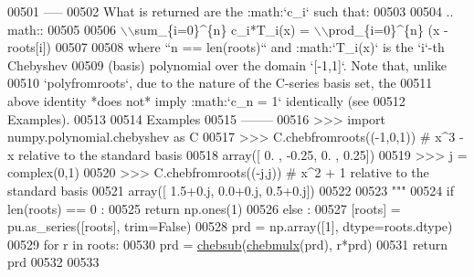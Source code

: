 \begin{DoxyCode}
00501 \textcolor{stringliteral}{    -----}
00502 \textcolor{stringliteral}{    What is returned are the :math:`c\_i` such that:}
00503 \textcolor{stringliteral}{}
00504 \textcolor{stringliteral}{    .. math::}
00505 \textcolor{stringliteral}{}
00506 \textcolor{stringliteral}{        \(\backslash\)\(\backslash\)sum\_\{i=0\}^\{n\} c\_i*T\_i(x) = \(\backslash\)\(\backslash\)prod\_\{i=0\}^\{n\} (x - roots[i])}
00507 \textcolor{stringliteral}{}
00508 \textcolor{stringliteral}{    where ``n == len(roots)`` and :math:`T\_i(x)` is the `i`-th Chebyshev}
00509 \textcolor{stringliteral}{    (basis) polynomial over the domain `[-1,1]`.  Note that, unlike}
00510 \textcolor{stringliteral}{    `polyfromroots`, due to the nature of the C-series basis set, the}
00511 \textcolor{stringliteral}{    above identity *does not* imply :math:`c\_n = 1` identically (see}
00512 \textcolor{stringliteral}{    Examples).}
00513 \textcolor{stringliteral}{}
00514 \textcolor{stringliteral}{    Examples}
00515 \textcolor{stringliteral}{    --------}
00516 \textcolor{stringliteral}{    >>> import numpy.polynomial.chebyshev as C}
00517 \textcolor{stringliteral}{    >>> C.chebfromroots((-1,0,1)) # x^3 - x relative to the standard basis}
00518 \textcolor{stringliteral}{    array([ 0.  , -0.25,  0.  ,  0.25])}
00519 \textcolor{stringliteral}{    >>> j = complex(0,1)}
00520 \textcolor{stringliteral}{    >>> C.chebfromroots((-j,j)) # x^2 + 1 relative to the standard basis}
00521 \textcolor{stringliteral}{    array([ 1.5+0.j,  0.0+0.j,  0.5+0.j])}
00522 \textcolor{stringliteral}{}
00523 \textcolor{stringliteral}{    """}
00524     \textcolor{keywordflow}{if} len(roots) == 0 :
00525         \textcolor{keywordflow}{return} np.ones(1)
00526     \textcolor{keywordflow}{else} :
00527         [roots] = pu.as\_series([roots], trim=\textcolor{keyword}{False})
00528         prd = np.array([1], dtype=roots.dtype)
00529         \textcolor{keywordflow}{for} r \textcolor{keywordflow}{in} roots:
00530             prd = \hyperlink{namespacepyneb_1_1utils_1_1chebyshev_ac07c70b217882a8c0a731ce9fdf743f0}{chebsub}(\hyperlink{namespacepyneb_1_1utils_1_1chebyshev_ab09f8accee50bd964e03071a659a7b5f}{chebmulx}(prd), r*prd)
00531         \textcolor{keywordflow}{return} prd
00532 
00533 
\end{DoxyCode}
\hypertarget{namespacepyneb_1_1utils_1_1chebyshev_a233e686a07b9935c74ce1e053f0c5f5f}{}
